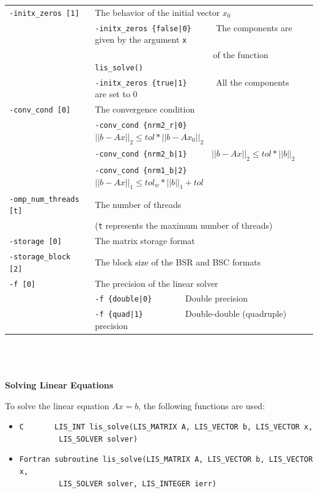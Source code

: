 \documentclass[a4paper]{article}
\begin{document}
\begin{minipage}[t]{\textwidth}
\begin{center}
\begin{tabular}{l|ll}
\verb=-initx_zeros [1]= & The behavior of the initial vector $x_{0}$  \\
                       & \verb=-initx_zeros {false|0}     =  The components are given by the argument \verb=x= \\
                       & \verb=                           =  of the function \verb=lis_solve()= \\
                       & \verb=-initx_zeros {true|1}      =  All the components are set to $0$ \\
\verb=-conv_cond [0]= & The convergence condition  \\
                       & \verb=-conv_cond {nrm2_r|0}     =  $||b-Ax||_2 \le tol * ||b-Ax_0||_2$ \\
                       & \verb=-conv_cond {nrm2_b|1}     =  $||b-Ax||_2 \le tol * ||b||_2$ \\
                       & \verb=-conv_cond {nrm1_b|2}     =  $||b-Ax||_1 \le tol_w * ||b||_1 + tol$\\
\verb=-omp_num_threads [t]= & The number of threads        \\ 
                            & (\verb=t= represents the maximum number of
 threads) \\
\verb=-storage [0]=    & The matrix storage format \\
\verb=-storage_block [2]=& The block size of the BSR and BSC formats\\ 
\verb=-f [0]=          & The precision of the linear solver\\
                       & \verb=-f {double|0}       =  Double precision \\ 
                       & \verb=-f {quad|1}         =  Double-double (quadruple) precision \\
\hline         
\end{tabular}
\end{center}
\end{minipage}
\\ \\ \\
\noindent
{\bf Solving Linear Equations}

To solve the linear equation $Ax = b$, the following functions are used:
\begin{itemize}
\item \verb|C       LIS_INT lis_solve(LIS_MATRIX A, LIS_VECTOR b, LIS_VECTOR x,|\\
      \verb|         LIS_SOLVER solver)|
\item \verb|Fortran subroutine lis_solve(LIS_MATRIX A, LIS_VECTOR b, LIS_VECTOR x,|\\
      \verb|         LIS_SOLVER solver, LIS_INTEGER ierr)|
\end{itemize}
\end{document}

